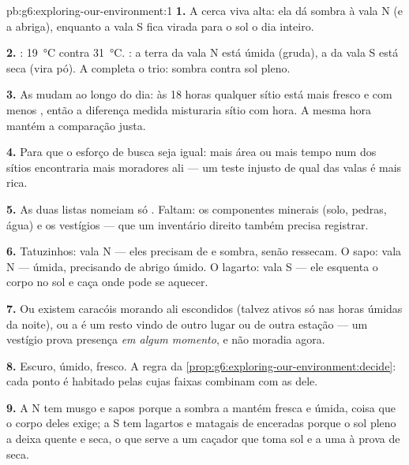\begin{solution}{pb:g6:exploring-our-environment:1}
\textbf{1.} A cerca viva alta: ela dá sombra à vala N (e a abriga),
enquanto a vala S fica virada para o sol o dia inteiro.

\textbf{2.} : \qty{19}{\degreeCelsius} contra
\qty{31}{\degreeCelsius}. : a terra da vala N está úmida
(gruda), a da vala S está seca (vira pó). A  completa o trio:
sombra contra sol pleno.

\textbf{3.} As  mudam ao longo do dia: às 18 horas qualquer
sítio está mais fresco e com menos , então a diferença medida
misturaria sítio com hora. A mesma hora mantém a comparação justa.

\textbf{4.} Para que o esforço de busca seja igual: mais área ou mais
tempo num dos sítios encontraria mais moradores ali --- um teste
injusto de qual das valas é mais rica.

\textbf{5.} As duas listas nomeiam só . Faltam: os
componentes minerais (solo, pedras, água) e os vestígios --- que um
inventário direito também precisa registrar.

\textbf{6.} Tatuzinhos: vala N --- eles precisam de  e sombra,
senão ressecam. O sapo: vala N ---  úmida, precisando de abrigo
úmido. O lagarto: vala S --- ele esquenta o corpo no sol e caça onde
pode se aquecer.

\textbf{7.} Ou existem caracóis morando ali escondidos (talvez ativos
só nas horas úmidas da noite), ou a  é um resto vindo de outro
lugar ou de outra estação --- um vestígio prova presença \emph{em
algum momento}, e não moradia agora.

\textbf{8.} Escuro, úmido, fresco. A regra da
\cref{prop:g6:exploring-our-environment:decide}: cada ponto é
habitado pelas  cujas faixas combinam com as  dele.

\textbf{9.} A N tem musgo e sapos porque a sombra a mantém fresca e
úmida, coisa que o corpo deles exige; a S tem lagartos e matagais de
 enceradas porque o sol pleno a deixa quente e seca, o que
serve a um caçador que toma sol e a uma  à prova de seca.


\end{solution}
